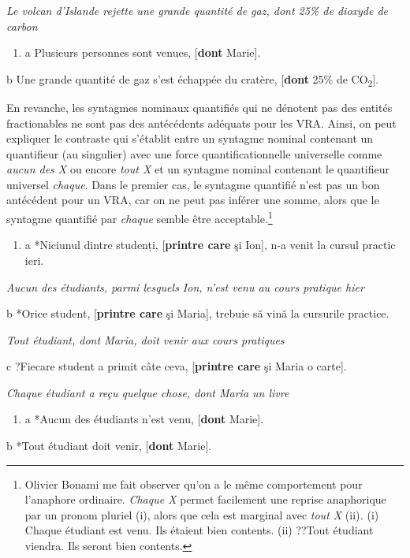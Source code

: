 {\itshape
Le volcan d'Islande rejette une grande quantité de gaz, dont 25\% de dioxyde de carbon } 


\begin{enumerate}
\item \label{bkm:Ref294027336}a  Plusieurs personnes sont venues, [\textbf{dont} Marie]. 


\end{enumerate}
  b  Une grande quantité de gaz s'est échappée du cratère, [\textbf{dont} 25\% de CO\textsubscript{2}].   

En revanche, les syntagmes nominaux quantifiés qui ne dénotent pas des entités fractionables ne sont pas des antécédents adéquats pour les VRA. Ainsi, on peut expliquer le contraste qui s'établit entre un syntagme nominal contenant un quantifieur (au singulier) avec une force quantificationnelle universelle comme \textit{aucun des X} ou encore \textit{tout X} et un syntagme nominal contenant le quantifieur universel \textit{chaque}. Dans le premier cas, le syntagme quantifié n'est pas un bon antécédent pour un VRA, car on ne peut pas inférer une somme, alors que le syntagme quantifié par \textit{chaque} semble être acceptable.\footnote{Olivier Bonami me fait observer qu'on a le même comportement pour l'anaphore ordinaire. \textit{Chaque X} permet facilement une reprise anaphorique par un pronom pluriel (i), alors que cela est marginal avec \textit{tout X} (ii)\textit{.}
(i)  Chaque étudiant est venu. Ils étaient bien contents.
(ii)  ??Tout étudiant viendra. Ils seront bien contents.}


\begin{enumerate}
\item \label{bkm:Ref298235479}a  *Niciunul dintre studenți, [\textbf{printre care} şi Ion], n-a venit la cursul practic ieri.  


\end{enumerate}
{\itshape
Aucun des étudiants, parmi lesquels Ion, n'est venu au cours pratique hier} 

  b  *Orice student, [\textbf{printre care} şi Maria], trebuie să vină la cursurile practice.

{\itshape
Tout étudiant, dont Maria, doit venir aux cours pratiques} 

  c  ?Fiecare student a primit câte ceva, [\textbf{printre care} şi Maria o carte].

{\itshape
Chaque étudiant a reçu quelque chose, dont Maria un livre}


\begin{enumerate}
\item \label{bkm:Ref298235482}a  *Aucun des étudiants n'est venu, [\textbf{dont} Marie]. 


\end{enumerate}
  b  *Tout étudiant doit venir, [\textbf{dont} Marie].

